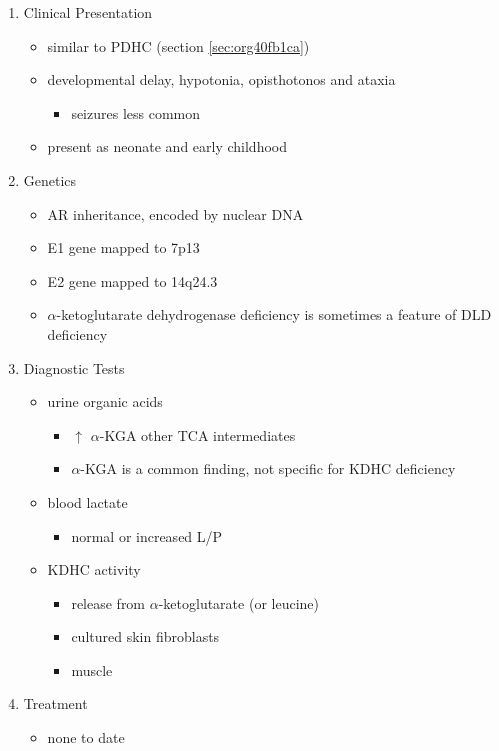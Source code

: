 \documentclass{scrartcl}
\begin{document}
\begin{enumerate}
\item Clinical Presentation
\label{sec:orge48e5e2}
\begin{itemize}
\item similar to PDHC (section \ref{sec:org40fb1ca})
\item developmental delay, hypotonia, opisthotonos and ataxia
\begin{itemize}
\item seizures less common
\end{itemize}
\item present as neonate and early childhood
\end{itemize}

\item Genetics
\label{sec:org9c19386}
\begin{itemize}
\item AR inheritance, encoded by nuclear DNA
\item E1 gene mapped to 7p13
\item E2 gene mapped to 14q24.3
\item \(\alpha\)-ketoglutarate dehydrogenase deficiency is sometimes a feature of DLD deficiency
\end{itemize}

\item Diagnostic Tests
\label{sec:orgb1339f7}
\begin{itemize}
\item urine organic acids
\begin{itemize}
\item \(\uparrow\) \(\alpha\)-KGA \textpm{} other TCA intermediates
\item \(\alpha\)-KGA is a common finding, not specific for KDHC deficiency
\end{itemize}
\item blood lactate
\begin{itemize}
\item normal or increased L/P
\end{itemize}
\item KDHC activity
\begin{itemize}
\item {} release from \ce{[1-^14C]} \(\alpha\)-ketoglutarate (or \ce{[1-^14C]} leucine)
\item cultured skin fibroblasts
\item muscle
\end{itemize}
\end{itemize}

\item Treatment
\label{sec:org5dd2d65}
\begin{itemize}
\item none to date
\end{itemize}
\end{enumerate}
\end{document}

